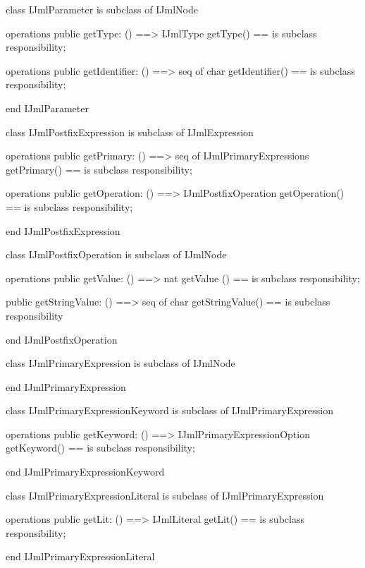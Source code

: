 \begin{vdm_al}
class IJmlParameter
 is subclass of IJmlNode

operations
  public getType: () ==> IJmlType
  getType() == is subclass responsibility;

operations
  public getIdentifier: () ==> seq of char
  getIdentifier() == is subclass responsibility;

end IJmlParameter
\end{vdm_al}

\begin{vdm_al}
class IJmlPostfixExpression
 is subclass of IJmlExpression

operations
  public getPrimary: () ==> seq of IJmlPrimaryExpressions
  getPrimary() == is subclass responsibility;

operations
  public getOperation: () ==> IJmlPostfixOperation
  getOperation() == is subclass responsibility;

end IJmlPostfixExpression
\end{vdm_al}

\begin{vdm_al}
class IJmlPostfixOperation
 is subclass of IJmlNode

operations
  public getValue: () ==> nat
  getValue () == is subclass responsibility;

  public getStringValue: () ==> seq of char
  getStringValue() == is subclass responsibility

end IJmlPostfixOperation
\end{vdm_al}

\begin{vdm_al}
class IJmlPrimaryExpression
 is subclass of IJmlNode

end IJmlPrimaryExpression
\end{vdm_al}

\begin{vdm_al}
class IJmlPrimaryExpressionKeyword
 is subclass of IJmlPrimaryExpression

operations
  public getKeyword: () ==> IJmlPrimaryExpressionOption
  getKeyword() == is subclass responsibility;

end IJmlPrimaryExpressionKeyword
\end{vdm_al}

\begin{vdm_al}
class IJmlPrimaryExpressionLiteral
 is subclass of IJmlPrimaryExpression

operations
  public getLit: () ==> IJmlLiteral
  getLit() == is subclass responsibility;

end IJmlPrimaryExpressionLiteral
\end{vdm_al}

